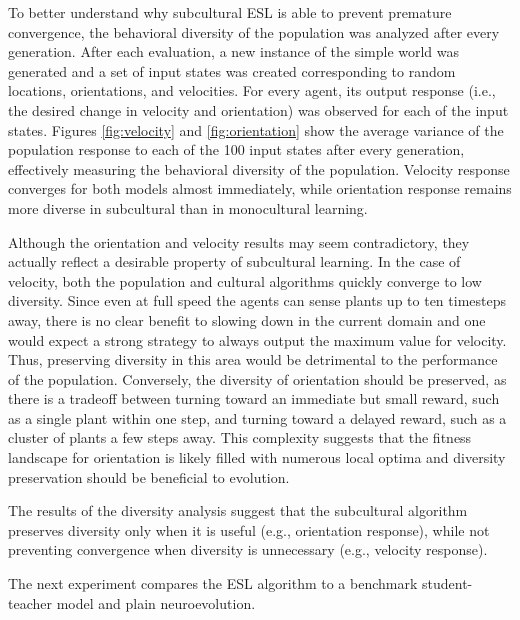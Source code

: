 \documentclass{sig-alternate}
\begin{document}
To better understand why subcultural ESL is able to prevent premature convergence, the behavioral diversity of the population was analyzed after every generation. After each evaluation, a new instance of the simple world was generated and a set of input states was created corresponding to random locations, orientations, and velocities. For every agent, its output response (i.e., the desired change in velocity and orientation) was observed for each of the input states. Figures \ref{fig:velocity} and \ref{fig:orientation} show the average variance of the population response to each of the 100 input states after every generation, effectively measuring the behavioral diversity of the population.  Velocity response converges for both models almost immediately, while orientation response remains more diverse in subcultural than in monocultural learning.

Although the orientation and velocity results may seem contradictory, they actually reflect a desirable property of subcultural learning. In the case of velocity, both the population and cultural algorithms quickly converge to low diversity. Since even at full speed the agents can sense plants up to ten timesteps away, there is no clear benefit to slowing down in the current domain and one would expect a strong strategy to always output the maximum value for velocity. Thus, preserving diversity in this area would be detrimental to the performance of the population. Conversely, the diversity of orientation should be preserved, as there is a tradeoff between turning toward an immediate but small reward, such as a single plant within one step, and turning toward a delayed reward, such as a cluster of plants a few steps away. This complexity suggests that the fitness landscape for orientation  is likely filled with numerous local optima and diversity preservation should be beneficial to evolution. 

The results of the diversity analysis suggest that the subcultural algorithm preserves diversity only when it is useful (e.g., orientation response), while not preventing convergence when diversity is unnecessary (e.g., velocity response).

The next experiment compares the ESL algorithm to a benchmark student-teacher model and plain neuroevolution.
\end{document}
